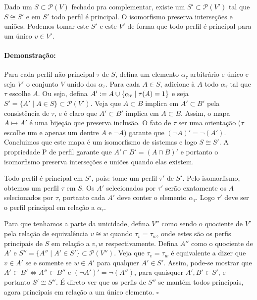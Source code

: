 \documentclass[11pt]{article}
\newcommand{\defeq}{\vcentcolon=}
\newcommand{\pulinho}{\vspace{.5cm}}
\theoremstyle{definition}
\theoremstyle{definition}
\theoremstyle{definition}
\theoremstyle{definition}
\newtheorem*{prop*}{Proposição}
\newenvironment{proposicao*}{
\definecolor{shadecolor}{HTML}{FFDBDF}
\begin{shaded}
\begin{prop*}
}
{
\end{prop*}
\end{shaded}
}
\theoremstyle{definition}
\theoremstyle{definition}
\theoremstyle{definition}
\theoremstyle{definition}
\theoremstyle{definition}
\theoremstyle{definition}
\theoremstyle{definition}
\theoremstyle{definition}
\newenvironment{prova}{\paragraph{Demonstração:}}{\hfill$\square$ 
\pulinho
}
\theoremstyle{definition}
\theoremstyle{definition}
\begin{document}
\begin{proposicao*}
  Dado um $S \subset \mathcal{P}(V)$ fechado pra complementar, existe um $S' \subset \mathcal{P}(V')$ tal que $S \cong S'$ e em $S'$ todo perfil é principal. O isomorfismo preserva interseções e uniões. Podemos tomar este $S'$ e este $V'$ de forma que todo perfil é principal para um único $v \in V'$. 
\end{proposicao*}
\begin{prova}
  Para cada perfil não principal $\tau$ de $S$, defina um elemento $\alpha_{\tau}$ arbitrário e único e seja $V'$ o conjunto $V$ unido dos $\alpha_{\tau}$. Para cada $A \in S$, adicione à $A$ todo $\alpha_{\tau}$ tal que $\tau$ escolhe $A$. Ou seja, defina $A' \defeq A \cup \{\alpha_{\tau} \mid \tau(A) = 1\}$ e seja $S' = \{A' \mid A \in S\} \subset \mathcal{P}(V')$. Veja que $A \subset B$ implica em $A' \subset B'$ pela consistência de $\tau$, e é claro que $A' \subset B'$ implica em $A \subset B$. Assim, o mapa $A \mapsto A'$ é uma bijeção que preserva inclusão. O fato de $\tau$ ser uma orientação ($\tau$ escolhe um e apenas um dentre $A$ e $\lnot A$) garante que $(\lnot A)' = \lnot (A')$. Concluimos que este mapa é um isomorfismo de sistemas e logo $S \cong S'$. A propriedade P de perfil garante que $A' \cap B' = (A \cap B)'$ e portanto o isomorfismo preserva interseções e uniões quando elas existem.

  Todo perfil é principal em $S'$, pois: tome um perfil $\tau'$ de $S'$. Pelo isomorfismo, obtemos um perfil $\tau$ em $S$. Os $A'$ selecionados por $\tau'$ serão exatamente os $A$ selecionados por $\tau$, portanto cada $A'$ deve conter o elemento $\alpha_{\tau}$. Logo $\tau'$ deve ser o perfil principal em relação a $\alpha_{\tau}$.

  Para que tenhamos a parte da unicidade, defina $V''$ como sendo o quociente de $V'$ pela relação de equivalência $v \cong w$ quando $\tau_v = \tau_w$, onde estes são os perfis principais de $S$ em relação a $v,w$ respectivamente. Defina $A''$ como o quociente de $A'$ e $S'' = \{A'' \mid A' \in S'\} \subset \mathcal{P}(V'')$. Veja que $\tau_v = \tau_w$ é equivalente a dizer que $v \in A'$ se e somente se $w \in A'$ para qualquer $A' \in S'$. Assim, pode-se mostrar que $A' \subset B' \iff A'' \subset B''$ e $(\lnot A')' = \lnot (A'')$, para quaisquer $A',B' \in S'$, e portanto $S' \cong S''$. É direto ver que os perfis de $S''$ se mantém todos principais, agora principais em relação a um único elemento.
\end{prova}
\end{document}
